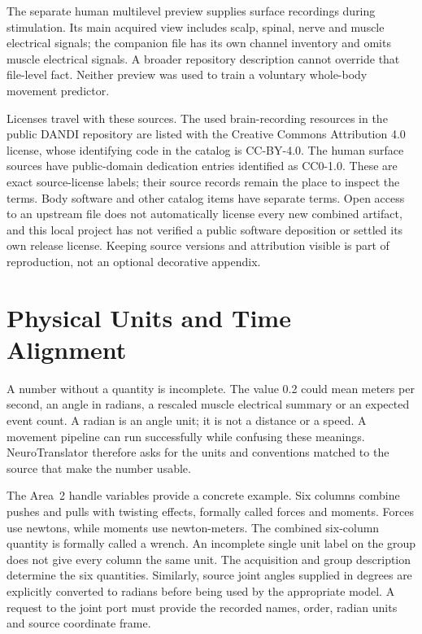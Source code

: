 The separate human multilevel preview supplies surface recordings during stimulation. Its main acquired view includes scalp, spinal, nerve and muscle electrical signals; the companion file has its own channel inventory and omits muscle electrical signals. A broader repository description cannot override that file-level fact. Neither preview was used to train a voluntary whole-body movement predictor.\cite{spinal_dataset2023,spinal_companion2023}

Licenses travel with these sources. The used brain-recording resources in the public DANDI repository are listed with the Creative Commons Attribution 4.0 license, whose identifying code in the catalog is CC-BY-4.0. The human surface sources have public-domain dedication entries identified as CC0-1.0. These are exact source-license labels; their source records remain the place to inspect the terms. Body software and other catalog items have separate terms. Open access to an upstream file does not automatically license every new combined artifact, and this local project has not verified a public software deposition or settled its own release license. Keeping source versions and attribution visible is part of reproduction, not an optional decorative appendix.

\section{Physical Units and Time Alignment}

A number without a quantity is incomplete. The value 0.2 could mean meters per second, an angle in radians, a rescaled muscle electrical summary or an expected event count. A radian is an angle unit; it is not a distance or a speed. A movement pipeline can run successfully while confusing these meanings. NeuroTranslator therefore asks for the units and conventions matched to the source that make the number usable.

The Area~2 handle variables provide a concrete example. Six columns combine pushes and pulls with twisting effects, formally called forces and moments. Forces use newtons, while moments use newton-meters. The combined six-column quantity is formally called a wrench. An incomplete single unit label on the group does not give every column the same unit. The acquisition and group description determine the six quantities. Similarly, source joint angles supplied in degrees are explicitly converted to radians before being used by the appropriate model. A request to the joint port must provide the recorded names, order, radian units and source coordinate frame.\cite{chowdhury2020}

